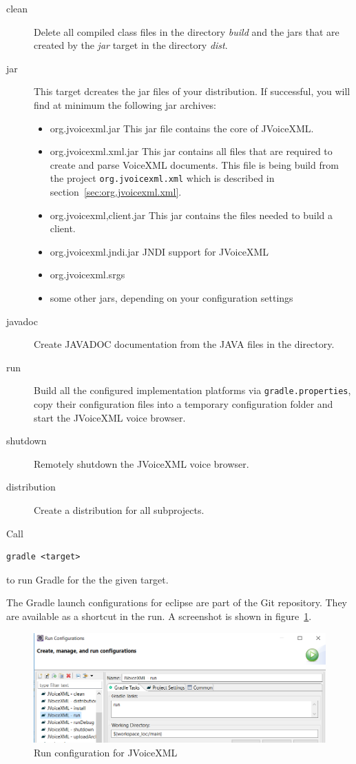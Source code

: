 \documentclass[11pt,a4paper]{article}
\begin{document}
\begin{description}
\item[clean]
Delete all compiled class files in the directory \emph{build}
and the jars that are created by the \emph{jar} target in the directory 
\emph{dist}.

\item[jar]
This target dcreates the jar files of your distribution.
If successful, you will find at minimum the following jar archives:
\begin{itemize}
\item org.jvoicexml.jar This jar file contains the core of JVoiceXML.
\item org.jvoicexml.xml.jar This jar contains all files that are required
to create and parse VoiceXML documents. This file is being build from the
project \texttt{org.jvoicexml.xml} which is described in
section~\ref{sec:org.jvoicexml.xml}.
\item org.jvoicexml,client.jar This jar contains the files needed to build
a client.
\item org.jvoicexml.jndi.jar JNDI support for JVoiceXML
\item org.jvoicexml.srgs
\item some other jars, depending on your configuration settings
\end{itemize}

\item[javadoc]
Create JAVADOC documentation from the JAVA files in the directory.
\item[run] Build all the configured implementation platforms
via \texttt{gradle.properties}, copy their configuration files into a
temporary configuration folder and start the JVoiceXML voice browser.
\item[shutdown] Remotely shutdown the JVoiceXML voice browser.
\item[distribution] Create a distribution for all subprojects.
\end{description}

Call
\begin{lstlisting}
gradle <target>
\end{lstlisting}
to run Gradle for the the given target.

The Gradle launch configurations for eclipse are part of the Git repository. They
are available as a shortcut in the run. A screenshot is shown in figure~\ref{fig:eclipse-launch}.
\begin{figure}
\includegraphics[width=\linewidth]{eclipse-launch.png}
\caption{Run configuration for JVoiceXML}
\label{fig:eclipse-launch}
\end{figure}
\end{document}
